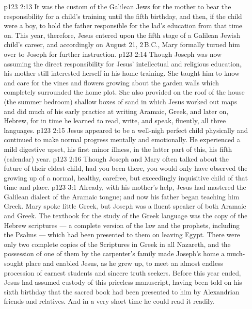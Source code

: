 \vs p123 2:13 \pc It was the custom of the Galilean Jews for the mother to bear the responsibility for a child’s training until the fifth birthday, and then, if the child were a boy, to hold the father responsible for the lad’s education from that time on. This year, therefore, Jesus entered upon the fifth stage of a Galilean Jewish child’s career, and accordingly on August 21, 2\,B.C., Mary formally turned him over to Joseph for further instruction.
\vs p123 2:14 Though Joseph was now assuming the direct responsibility for Jesus’ intellectual and religious education, his mother still interested herself in his home training. She taught him to know and care for the vines and flowers growing about the garden walls which completely surrounded the home plot. She also provided on the roof of the house (the summer bedroom) shallow boxes of sand in which Jesus worked out maps and did much of his early practice at writing Aramaic, Greek, and later on, Hebrew, for in time he learned to read, write, and speak, fluently, all three languages.
\vs p123 2:15 Jesus appeared to be a well\hyp{}nigh perfect child physically and continued to make normal progress mentally and emotionally. He experienced a mild digestive upset, his first minor illness, in the latter part of this, his fifth (calendar) year.
\vs p123 2:16 Though Joseph and Mary often talked about the future of their eldest child, had you been there, you would only have observed the growing up of a normal, healthy, carefree, but exceedingly inquisitive child of that time and place.
\vs p123 3:1 Already, with his mother’s help, Jesus had mastered the Galilean dialect of the Aramaic tongue; and now his father began teaching him Greek. Mary spoke little Greek, but Joseph was a fluent speaker of both Aramaic and Greek. The textbook for the study of the Greek language was the copy of the Hebrew scriptures --- a complete version of the law and the prophets, including the Psalms --- which had been presented to them on leaving Egypt. There were only two complete copies of the Scriptures in Greek in all Nazareth, and the possession of one of them by the carpenter’s family made Joseph’s home a much\hyp{}sought place and enabled Jesus, as he grew up, to meet an almost endless procession of earnest students and sincere truth seekers. Before this year ended, Jesus had assumed custody of this priceless manuscript, having been told on his sixth birthday that the sacred book had been presented to him by Alexandrian friends and relatives. And in a very short time he could read it readily.
